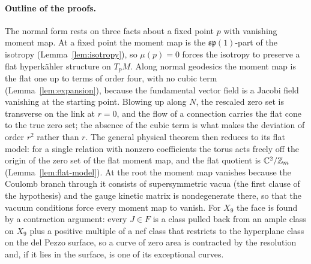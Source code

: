 \paragraph{Outline of the proofs.}
The normal form rests on three facts about a fixed point $p$ with vanishing moment map. At a
fixed point the moment map is the $\mathfrak{sp}(1)$-part of the isotropy
(Lemma~\ref{lem:isotropy}), so $\mu(p)=0$ forces the isotropy to preserve a flat hyperk\"ahler
structure on $T_pM$. Along normal geodesics the moment map is the flat one up to terms of order
four, with no cubic term (Lemma~\ref{lem:expansion}), because the fundamental vector field is a
Jacobi field vanishing at the starting point. Blowing up along $N$, the rescaled zero set is
transverse on the link at $r=0$, and the flow of a connection carries the flat cone to the true
zero set; the absence of the cubic term is what makes the deviation of order $r^2$ rather than
$r$. The general physical theorem then reduces to its flat model: for a single relation with
nonzero coefficients the torus acts freely off the origin of the zero set of the flat moment
map, and the flat quotient is $\mathbb C^2/\mathbb Z_m$ (Lemma~\ref{lem:flat-model}). At the root the
moment map vanishes because the Coulomb branch through it consists of supersymmetric vacua (the
first clause of the hypothesis) and the gauge kinetic matrix is nondegenerate there, so that the
vacuum conditions force every moment map to vanish. For $X_9$ the face is found by a contraction
argument: every $J\in F$ is a class pulled back from an ample class on $X_9$ plus a positive multiple
of a nef class that restricts to the hyperplane class on the del Pezzo surface, so a curve of zero area
is contracted by the resolution and, if it lies in the surface, is one of its exceptional
curves.

